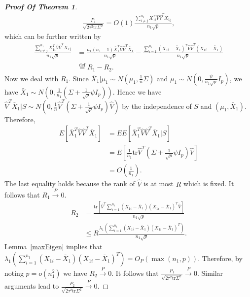 \documentclass[review]{elsarticle}
\theoremstyle{plain}
\theoremstyle{definition}
\theoremstyle{remark}
\begin{document}
\begin{proof}[\textbf{Proof Of Theorem 1}]
\begin{equation*}
\begin{aligned}
    \frac{P_1}{\sqrt{2\tau^2\mathrm{tr}\Sigma^2}}=O(1)\frac{\sum_{i\neq j}^{n_1}X_{1i}^T\hat{V}\hat{V}^T X_{1j}}{n_1\sqrt{p}},
\end{aligned}
\end{equation*}
which can be further written by
\begin{equation*}
\begin{aligned}
\frac{\sum_{i\neq j}^{n_1}X_{1i}^T\hat{V}\hat{V}^T X_{1j}}{n_1\sqrt{p}}
    &=\frac{n_1(n_1-1)\bar{X}_1^T\hat{V}\hat{V}^T\bar{X}_1}{n_1\sqrt{p}}- \frac{\sum_{i=1}^{n_1}{(X_{1i}-\bar{X}_1)}^T\hat{V}\hat{V}^T(X_{1i}-\bar{X}_1)}{n_1\sqrt{p}}\\
    &\overset{\textrm{def}}{=}R_1-R_2.
\end{aligned}
\end{equation*}
Now we deal with $R_1$. Since 
    $\bar{X}_1|\mu_1\sim N(\mu_1,\frac{1}{n}\Sigma)$ and
    $\mu_1\sim N(0,\frac{\psi}{n_1\sqrt{p}}I_p)$,
we have $\bar{X}_1\sim N(0,\frac{1}{n_1}(\Sigma+\frac{1}{\sqrt{p}}\psi I_p))$. Hence we have $\hat{V}^T\bar{X}_1|S\sim N(0,\frac{1}{n}\hat{V}^T(\Sigma+\frac{1}{\sqrt{p}}\psi I_p)\hat{V})$ by the independence of $S$ and $(\mu_1,\bar{X}_1)$. Therefore,
\begin{equation*}
    \begin{aligned}
        E[\bar{X}_1^T\hat{V}\hat{V}^T\bar{X}_1]&=
    EE[\bar{X}_1^T\hat{V}\hat{V}^T\bar{X}_1|S]\\
        &=E[\frac{1}{n_1}\mathrm{tr} \hat{V}^T(\Sigma+\frac{1}{\sqrt{p}}\psi I_p)\hat{V}]\\
        &=O(\frac{1}{n_1}).
    \end{aligned}
\end{equation*}
    The last equality holds because the rank of $\hat{V}$ is at most $R$ which is fixed. It follows that $R_1\xrightarrow{P} 0$.
\begin{equation*}
\begin{aligned}
    R_2&=\frac{\mathrm{tr}[\hat{V}^T\sum_{i=1}^{n_1}(X_{1i}-\bar{X}_1){(X_{1i}-\bar{X}_1)}^T\hat{V}]}{n_1\sqrt{p}}\\
    &\leq R\frac{\lambda_1(\sum_{i=1}^{n_1}(X_{1i}-\bar{X}_1){(X_{1i}-\bar{X}_1)}^T)}{n_1\sqrt{p}}.
\end{aligned}
\end{equation*}
Lemma~\ref{maxEigen} implies that $\lambda_1(\sum_{i=1}^{n_1}(X_{1i}-\bar{X}_1){(X_{1i}-\bar{X}_1)}^T)=O_P(\max(n_1,p))$.
Therefore, by noting $p=o(n_1^2)$ we have $R_2\xrightarrow{P}0$. 
 It follows that $\frac{P_1}{\sqrt{2\tau^2\mathrm{tr}\Sigma^2}}\xrightarrow{P}0$.
 Similar arguments lead to $\frac{P_2}{\sqrt{2\tau^2\mathrm{tr}\Sigma^2}}\xrightarrow{P}0$.


\end{proof}
\end{document}
